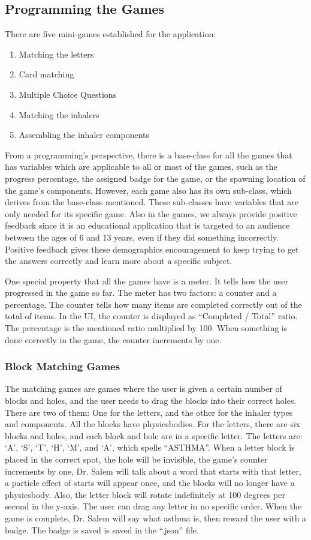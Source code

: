 \subsection{Programming the Games}

There are five mini-games established for the application:
\begin{enumerate}
\item{Matching the letters}
\item{Card matching}
\item{Multiple Choice Questions}
\item{Matching the inhalers}
\item{Assembling the inhaler components}
\end{enumerate}

From a programming’s perspective, there is a base-class for all the games that has variables which are applicable to all or most of the games, such as the progress percentage, the assigned badge for the game, or the spawning location of the game’s components. However, each game also has its own sub-class, which derives from the base-class mentioned. These sub-classes have variables that are only needed for its specific game. Also in the games, we always provide positive feedback since it is an educational application that is targeted to an audience between the ages of 6 and 13 years, even if they did something incorrectly. Positive feedback gives these demographics encouragement to keep trying to get the answers correctly and learn more about a specific subject.
 
One special property that all the games have is a meter. It tells how the user progressed in the game so far. The meter has two factors: a counter and a percentage. The counter tells how many items are completed correctly out of the total of items. In the UI, the counter is displayed as “Completed / Total” ratio. The percentage is the mentioned ratio multiplied by 100. When something is done correctly in the game, the counter increments by one.

\subsubsection*{Block Matching Games}
The matching games are games where the user is given a certain number of blocks and holes, and the user needs to drag the blocks into their correct holes. There are two of them: One for the letters, and the other for the inhaler types and components. All the blocks have physicsbodies. For the letters, there are six blocks and holes, and each block and hole are in a specific letter. The letters are: ‘A’, ‘S’, ‘T’, ‘H’, ‘M’, and ‘A’, which spells “ASTHMA”. When a letter block is placed in the correct spot, the hole will be invisible, the game’s counter increments by one, Dr. Salem will talk about a word that starts with that letter, a particle effect of starts will appear once, and the blocks will no longer have a physicsbody. Also, the letter block will rotate indefinitely at 100 degrees per second in the y-axis. The user can drag any letter in no specific order. When the game is complete, Dr. Salem will say what asthma is, then reward the user with a badge. The badge is saved is saved in the “.json” file.

